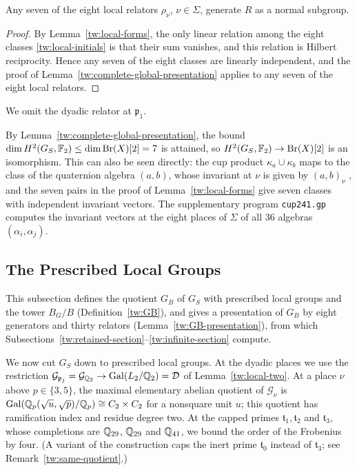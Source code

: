 \begin{corollary}\label{tw:any-seven}
Any seven of the eight local relators $\rho_\nu$, $\nu\in\Sigma$, generate
$R$ as a normal subgroup.
\end{corollary}

\begin{proof}
By Lemma~\ref{tw:local-forms}, the only linear relation among the eight
classes \eqref{tw:local-initials} is that their sum vanishes, and this
relation is Hilbert reciprocity. Hence any seven of the eight classes are
linearly independent, and the proof of
Lemma~\ref{tw:complete-global-presentation} applies to any seven of the eight
local relators.
\end{proof}

We omit the dyadic relator at $\mathfrak p_1$.

\begin{remark}\label{tw:cup-remark}
By Lemma~\ref{tw:complete-global-presentation}, the bound
$\dim H^2(G_S,\mathbb F_2)\le\dim\operatorname{Br}(X)[2]=7$ is attained, so
$H^2(G_S,\mathbb F_2)\to\operatorname{Br}(X)[2]$ is an isomorphism. This can also be seen
directly: the cup product
$\kappa_a\cup\kappa_b$ maps to the class of the quaternion algebra $(a,b)$, whose
invariant at $\nu$ is given by $(a,b)_\nu$ \cite[Chapter~III,
Remark~4.7]{MilneCFT}, and the seven pairs in the proof of
Lemma~\ref{tw:local-forms} give seven classes with independent invariant
vectors. The supplementary program \texttt{cup241.gp} computes the invariant
vectors at the eight places of $\Sigma$ of all $36$ algebras
$(\alpha_i,\alpha_j)$.
\end{remark}

\subsection{The Prescribed Local Groups}\label{tw:prescribed-section}
This subsection defines the quotient $G_B$ of $G_S$ with prescribed local
groups and the tower $B_G/B$ (Definition~\ref{tw:GB}), and gives a
presentation of $G_B$ by eight generators and thirty relators
(Lemma~\ref{tw:GB-presentation}), from which
Subsections~\ref{tw:retained-section}--\ref{tw:infinite-section} compute.

We now cut $G_S$ down to prescribed local groups. At the dyadic
places we use the restriction
$\mathcal G_{\mathfrak p_j}=\mathcal G_{\mathbb Q_2}\to\operatorname{Gal}(L_2/\mathbb Q_2)=\mathcal D$ of
Lemma~\ref{tw:local-two}. At a place $\nu$ above $p\in\{3,5\}$, the maximal
elementary abelian quotient of $\mathcal G_\nu$ is
$\operatorname{Gal}(\mathbb Q_p(\sqrt u,\sqrt p)/\mathbb Q_p)\cong C_2\times C_2$ for a nonsquare unit $u$;
this quotient has ramification index and residue degree two. At
the capped primes $\mathfrak t_1,\mathfrak t_2$ and $\mathfrak t_3$, whose
completions are $\mathbb Q_{29}$, $\mathbb Q_{29}$ and $\mathbb Q_{41}$, we bound the order of the
Frobenius by four. (A variant of the construction caps the inert prime
$\mathfrak t_0$ instead of $\mathfrak t_3$; see
Remark~\ref{tw:same-quotient}.)

